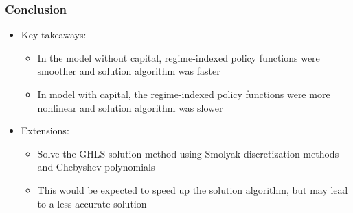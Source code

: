 \documentclass[11pt]{beamer}
\begin{document}
\begin{frame}\frametitle{Conclusion}
\begin{itemize}\setlength{\itemsep}{10pt}
\item Key takeaways:
\begin{itemize}\setlength{\itemsep}{4pt}
\item In the model without capital, regime-indexed policy functions were smoother and solution algorithm was faster
\item In model with capital,  the regime-indexed policy functions were more nonlinear and solution algorithm was slower
\end{itemize}
\item Extensions:
\begin{itemize}\setlength{\itemsep}{4pt}
\item Solve the GHLS solution method using Smolyak discretization methods and Chebyshev polynomials 
\item This would be expected to speed up the solution algorithm, but may lead to a less accurate solution
\end{itemize}
\end{itemize}
\end{frame}
\end{document}
